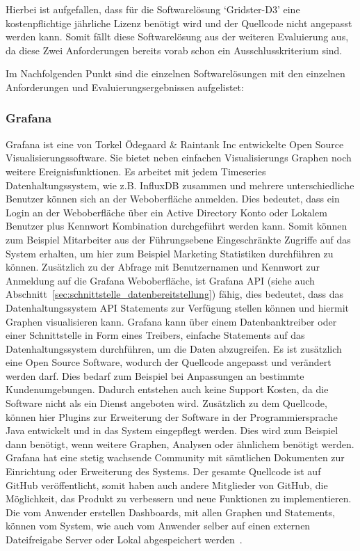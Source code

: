 Hierbei ist aufgefallen, dass für die Softwarelösung `Gridster-D3' eine
kostenpflichtige jährliche Lizenz benötigt wird und der Quellcode nicht
angepasst werden kann. Somit fällt diese Softwarelösung aus der weiteren
Evaluierung aus, da diese Zwei Anforderungen bereits vorab schon ein
Ausschlusskriterium sind.

Im Nachfolgenden Punkt sind die einzelnen Softwarelösungen mit den einzelnen
Anforderungen und Evaluierungsergebnissen aufgelistet:
\mr%

\subsubsection{Grafana}
\label{subsubsec:grafana}
Grafana ist eine von Torkel Ödegaard \& Raintank Inc entwickelte Open Source
Visualisierungssoftware. Sie bietet neben einfachen Visualisierungs Graphen
noch weitere Ereignisfunktionen. Es arbeitet mit jedem Timeseries
Datenhaltungssystem, wie z.B. InfluxDB zusammen und mehrere unterschiedliche
Benutzer können sich an der Weboberfläche anmelden. Dies bedeutet, dass ein
Login an der Weboberfläche über ein \gls{Active Directory} Konto oder Lokalem
Benutzer plus Kennwort Kombination durchgeführt werden kann. Somit können zum
Beispiel Mitarbeiter aus der Führungsebene Eingeschränkte Zugriffe auf das
System erhalten, um hier zum Beispiel Marketing Statistiken durchführen zu
können. Zusätzlich zu der Abfrage mit Benutzernamen und Kennwort zur Anmeldung
auf die Grafana Weboberfläche, ist Grafana API (siehe auch
Abschnitt~\ref{sec:schnittstelle_datenbereitstellung}) fähig, dies bedeutet,
dass das Datenhaltungssystem API Statements zur Verfügung stellen können und
hiermit Graphen visualisieren kann. Grafana kann über einem
\gls{Datenbanktreiber} oder einer Schnittstelle in Form eines Treibers,
einfache Statements auf das Datenhaltungssystem durchführen, um die Daten
abzugreifen. Es ist zusätzlich eine Open Source Software, wodurch der Quellcode
angepasst und verändert werden darf. Dies bedarf zum Beispiel bei Anpassungen
an bestimmte Kundenumgebungen. Dadurch entstehen auch keine Support Kosten, da
die Software nicht als ein Dienst angeboten wird. Zusätzlich zu dem Quellcode,
können hier Plugins zur Erweiterung der Software in der Programmiersprache Java
entwickelt und in das System eingepflegt werden. Dies wird zum Beispiel dann
benötigt, wenn weitere Graphen, Analysen oder ähnlichem benötigt werden.
Grafana hat eine stetig wachsende Community mit sämtlichen Dokumenten zur
Einrichtung oder Erweiterung des Systems. Der gesamte Quellcode ist auf GitHub
veröffentlicht, somit haben auch andere Mitglieder von GitHub, die Möglichkeit,
das Produkt zu verbessern und neue Funktionen zu implementieren. Die vom
Anwender erstellen Dashboards, mit allen Graphen und Statements, können vom
System, wie auch vom Anwender selber auf einen externen Dateifreigabe Server
oder Lokal abgespeichert werden~\cite{grafana}.

